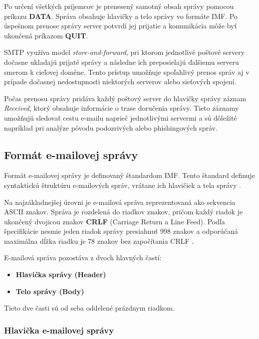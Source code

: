 \documentclass[conference]{IEEEtran}
\begin{document}
Po určení všetkých príjemcov je prenesený samotný obsah správy pomocou 
príkazu \textbf{DATA}. Správa obsahuje hlavičky a telo správy vo formáte 
IMF. Po úspešnom prenose správy server potvrdí jej 
prijatie a komunikácia môže byť ukončená príkazom \textbf{QUIT}\cite{rfc5321}.

SMTP využíva model \textit{store-and-forward}, pri ktorom jednotlivé 
poštové servery dočasne ukladajú prijaté správy a následne ich 
preposielajú ďalšiemu serveru smerom k cieľovej doméne. Tento prístup 
umožňuje spoľahlivý prenos správ aj v prípade dočasnej nedostupnosti 
niektorých serverov alebo sieťových spojení\cite{rfc5321}.

Počas prenosu správy pridáva každý poštový server do hlavičky 
správy záznam \textit{Received}, ktorý obsahuje informácie o trase 
doručenia správy. Tieto záznamy umožňujú sledovať cestu e-mailu 
naprieč jednotlivými servermi a sú dôležité napríklad pri analýze 
pôvodu podozrivých alebo phishingových správ\cite{rfc5321}.

\subsection{Formát e-mailovej správy}

Formát e-mailovej správy je definovaný štandardom 
IMF. Tento štandard definuje syntaktickú štruktúru e-mailových správ, 
vrátane ich hlavičiek a tela správy \cite{rfc5322}.

Na najzákladnejšej úrovni je e-mailová správa reprezentovaná ako sekvencia 
ASCII znakov. Správa je rozdelená do riadkov znakov, pričom každý riadok 
je ukončený dvojicou znakov \textbf{CRLF} (Carriage Return a Line Feed). 
Podľa špecifikácie nesmie jeden riadok správy presiahnuť 998 znakov a 
odporúčaná maximálna dĺžka riadku je 78 znakov bez započítania CRLF 
\cite{rfc5322}.

E-mailová správa pozostáva z dvoch hlavných častí:

\begin{itemize}
\item \textbf{Hlavička správy (Header)}
\item \textbf{Telo správy (Body)}
\end{itemize}

Tieto dve časti sú od seba oddelené prázdnym riadkom.

\subsubsection{Hlavička e-mailovej správy}
\end{document}
